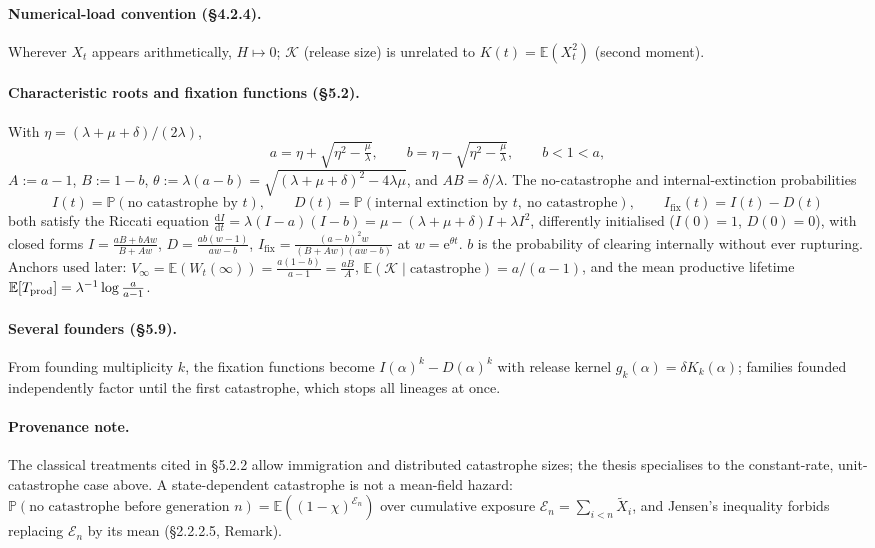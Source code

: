\documentclass[11pt,a4paper]{report}
\newcommand{\pr}[1]{\mathbb{P}\!\left(#1\right)}
\newcommand{\ex}[1]{\mathbb{E}\!\left(#1\right)}
\newcommand{\mean}[1]{\mathbb{E}\!\left[#1\right]}
\newcommand{\dd}{\mathrm{d}}
\newcommand{\ee}{\mathrm{e}}
\newcommand{\ddt}[1]{\frac{\dd #1}{\dd t}}
\newcommand{\Ifix}{I_{\mathrm{fix}}}
\newcommand{\Kr}{\mathcal{K}}      %
\newcommand{\Xt}{X_t}
\newcommand{\Wt}{W_t}
\begin{document}
\paragraph{Numerical-load convention (\S4.2.4).} Wherever $\Xt$ appears
arithmetically, $H\mapsto 0$; $\Kr$ (release size) is unrelated to
$K(t)=\ex{\Xt^2}$ (second moment).

\paragraph{Characteristic roots and fixation functions (\S5.2).} With
$\eta=(\lambda+\mu+\delta)/(2\lambda)$,
\begin{equation}
a=\eta+\sqrt{\eta^2-\tfrac{\mu}{\lambda}},
\qquad
b=\eta-\sqrt{\eta^2-\tfrac{\mu}{\lambda}},
\qquad
b<1<a,
\end{equation}
$A:=a-1$, $B:=1-b$, $\theta:=\lambda(a-b)
=\sqrt{(\lambda+\mu+\delta)^2-4\lambda\mu}$, and $AB=\delta/\lambda$.
The no-catastrophe and internal-extinction probabilities
\begin{equation}
I(t)=\pr{\text{no catastrophe by }t},
\qquad
D(t)=\pr{\text{internal extinction by }t,\ \text{no catastrophe}},
\qquad
\Ifix(t)=I(t)-D(t)
\end{equation}
both satisfy the Riccati equation
$\ddt{I}=\lambda(I-a)(I-b)=\mu-(\lambda+\mu+\delta)I+\lambda I^2$,
differently initialised ($I(0)=1$, $D(0)=0$), with closed forms
$I=\frac{aB+bAw}{B+Aw}$, $D=\frac{ab(w-1)}{aw-b}$,
$\Ifix=\frac{(a-b)^2w}{(B+Aw)(aw-b)}$ at $w=\ee^{\theta t}$.
$b$ is the probability of clearing internally without ever rupturing.
Anchors used later: $V_\infty=\ex{\Wt(\infty)}=\frac{a(1-b)}{a-1}=\frac{aB}{A}$,
$\ex{\Kr\mid\text{catastrophe}}=a/(a-1)$, and the mean productive lifetime
$\mean{T_{\rm prod}}=\lambda^{-1}\log\frac{a}{a-1}$.

\paragraph{Several founders (\S5.9).} From founding multiplicity $k$, the
fixation functions become $I(\alpha)^k-D(\alpha)^k$ with release kernel
$g_k(\alpha)=\delta K_k(\alpha)$; families founded independently factor
until the first catastrophe, which stops all lineages at once.

\paragraph{Provenance note.} The classical treatments cited in \S5.2.2
allow immigration and distributed catastrophe sizes; the thesis specialises
to the constant-rate, unit-catastrophe case above. A state-dependent
catastrophe is not a mean-field hazard:
$\pr{\text{no catastrophe before generation }n}
=\ex{(1-\chi)^{\mathcal E_n}}$ over cumulative exposure
$\mathcal E_n=\sum_{i<n}\widetilde X_i$, and Jensen's inequality forbids
replacing $\mathcal E_n$ by its mean (\S2.2.2.5, Remark).
\end{document}
